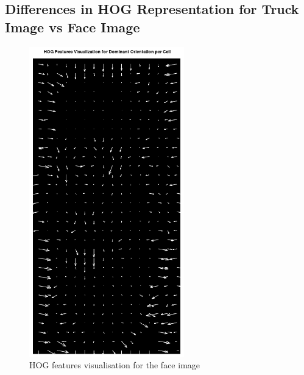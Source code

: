\documentclass[a4paper]{article}
\begin{document}
\subsection{Differences in HOG Representation for Truck Image vs Face Image}
\begin{minipage}{0.49\textwidth}
\begin{figure}[H]
    \centering
    \includegraphics[width=0.6\textwidth]{./images/1_hog_features.png}
    \caption{HOG features visualisation for the face image}
\end{figure}
\end{minipage}
\hfill
\end{document}
